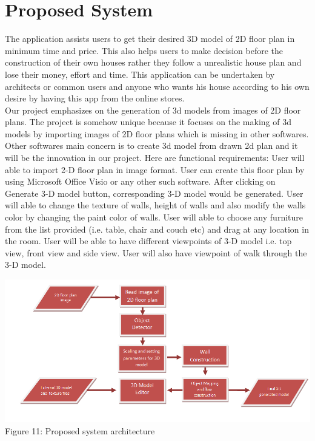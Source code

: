 \documentclass{article}
\begin{document}
\section{Proposed System}
The application assists users to get their desired 3D model of 2D floor plan in minimum time and price. This also helps users to make decision before the construction of their own houses rather they follow a unrealistic house plan and lose their money, effort and time. This application can be undertaken by architects or common users and anyone who wants his house according to his own desire by having this app from the online stores.
\\
Our project emphasizes on the generation of 3d models from images of 2D floor plans. The project is somehow unique because it focuses on the making of 3d models by importing images of 2D floor plans which is missing in other softwares. Other softwares main concern is to create 3d model from drawn 2d plan and it will be the innovation in our project. Here are functional requirements:
User will able to import 2-D floor plan in image format. User can create this floor plan by using Microsoft Office Visio or any other such software.
After clicking on Generate 3-D model button, corresponding 3-D model would be generated.
User will able to change the texture of walls, height of walls and also modify the walls color by changing the paint color of walls.
User will able to choose any furniture from the list provided (i.e. table, chair and couch etc) and drag at any location in the room.
User will be able to have different viewpoints of 3-D model i.e. top view, front view and side view. User will also have viewpoint of walk through the 3-D model.

\begin{center}
\includegraphics[scale=0.7]{diagram}
\\Figure 11: Proposed system architecture
\end{center}
\end{document}
